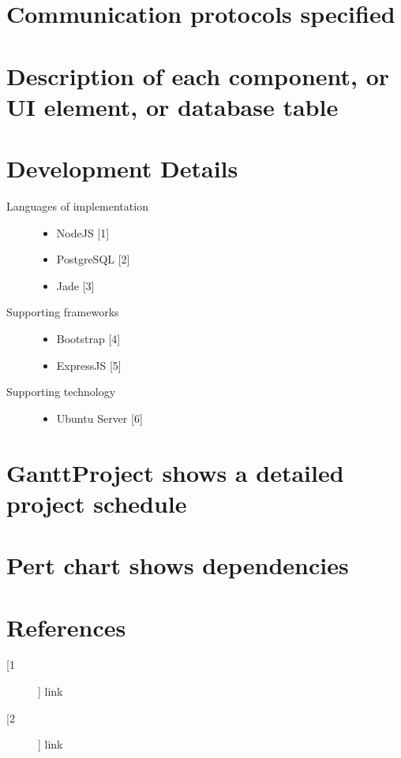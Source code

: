 \documentclass[12pt]{article}
\begin{document}
\section{Communication protocols specified}

%
\section{Description of each component, or UI element, or database table}

%
\section{Development Details}
\begin{description}
  \item[Languages of implementation] \hfill
    \begin{itemize}
      \item NodeJS [1]
      \item PostgreSQL [2]
      \item Jade [3]
    \end{itemize}
  \item[Supporting frameworks] \hfill
    \begin{itemize}
      \item Bootstrap [4]
      \item ExpressJS [5]
    \end{itemize}
  \item[Supporting technology] \hfill
    \begin{itemize}
      \item Ubuntu Server [6]
    \end{itemize}
\end{description}

%
\section{GanttProject shows a detailed project schedule}

%
\section{Pert chart shows dependencies}

%
\section{References}
\begin{description}
  \item[[1]] link
  \item[[2]] link
\end{description}
\end{document}
